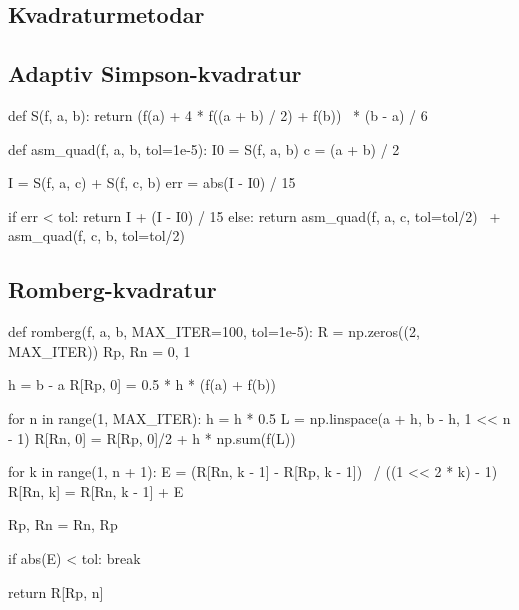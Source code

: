 \documentclass[12pt]{article}
\begin{document}
\begin{multicols*}{2}

    \section{Kvadraturmetodar}


    \subsection{Adaptiv Simpson-kvadratur}
\begin{python}[caption={Adaptiv Simpson-kvadratur}]
def S(f, a, b):
    return (f(a) + 4 * f((a + b) / 2) + f(b))  \
         * (b - a) / 6

def asm_quad(f, a, b, tol=1e-5):
    I0 = S(f, a, b)
    c = (a + b) / 2

    I = S(f, a, c) + S(f, c, b)
    err = abs(I - I0) / 15

    if err < tol:
        return I + (I - I0) / 15
    else:
        return asm_quad(f, a, c, tol=tol/2)  \
             + asm_quad(f, c, b, tol=tol/2)
\end{python}


    \subsection{Romberg-kvadratur}

\begin{python}[caption={Romberg-kvadratur}]
def romberg(f, a, b, MAX_ITER=100, tol=1e-5):
    R = np.zeros((2, MAX_ITER))
    Rp, Rn = 0, 1

    h = b - a
    R[Rp, 0] = 0.5 * h * (f(a) + f(b))

    for n in range(1, MAX_ITER):
        h = h * 0.5
        L = np.linspace(a + h, b - h, 1 << n - 1)
        R[Rn, 0] = R[Rp, 0]/2 + h * np.sum(f(L))

        for k in range(1, n + 1):
            E = (R[Rn, k - 1] - R[Rp, k - 1])  \
              / ((1 << 2 * k) - 1)
            R[Rn, k] = R[Rn, k - 1] + E

        Rp, Rn = Rn, Rp

        if abs(E) < tol:
            break

    return R[Rp, n]
\end{python}



\end{multicols*}
\end{document}
